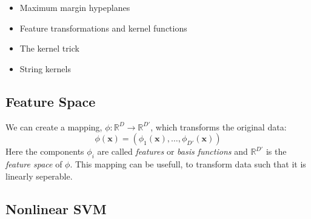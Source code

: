 \begin{itemize}
    \item Maximum margin hypeplanes
    \item Feature transformations and kernel functions
    \item The kernel trick
    \item String kernels
\end{itemize}

\subsection{Feature Space}

We can create a mapping, $\phi : \mathbb{R}^D \rightarrow \mathbb{R}^{D'}$, which transforms the original data:
\[
    \phi(\mathbf{x}) = (\phi_1(\mathbf{x}), \dots, \phi_{D'}(\mathbf{x}))
\]
Here the components $\phi_i$ are called \emph{features} or \emph{basis functions} and $\mathbb{R}^{D'}$ is the \emph{feature space} of $\phi$.
This mapping can be usefull, to transform data such that it is linearly seperable.

\subsection{Nonlinear SVM}


